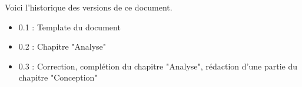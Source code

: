 Voici l’historique des versions de ce document.

\begin{itemize}
	\item 0.1 : Template du document
	\item 0.2 : Chapitre "Analyse"
	\item 0.3 : Correction, complétion du chapitre "Analyse", rédaction d'une partie du chapitre "Conception"
\end{itemize}